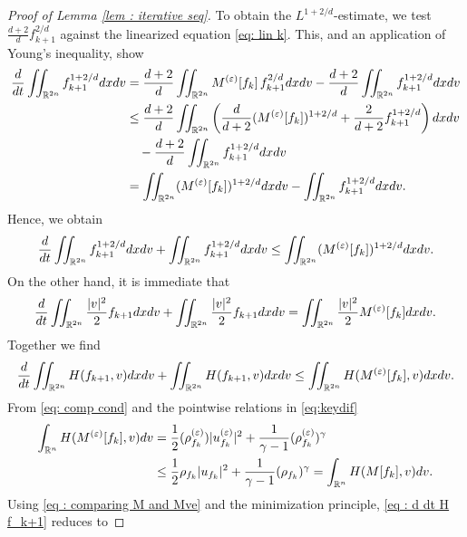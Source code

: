 \documentclass{amsart}
\theoremstyle{plain}
\theoremstyle{remark}
\numberwithin{equation}{section}
\newcommand{\R}{\mathbb{R}}
\newcommand{\ve}{\varepsilon}
\newcommand{\dx}{\textnormal{d}x}
\newcommand{\dv}{\textnormal{d}v}
\begin{document}
\begin{proof}[Proof of Lemma \ref{lem : iterative seq}]
To obtain the $L^{1+2/d}$-estimate, we test $\frac{d+2}{d}f_{k+1}^{2/d}$ against the linearized equation \eqref{eq: lin k}. This, and an application of Young's inequality, show
\begin{align*}
    \frac{\textnormal{d}}{\textnormal{d}t} \iint_{\R^{2n}} f_{k+1}^{1+2/d} \dx\dv
    &= \frac{d+2}{d}\iint_{\R^{2n}} M^{(\ve)}[f_k] \, f_{k+1}^{2/d} \dx\dv - \frac{d+2}{d}\iint_{\R^{2n}} f_{k+1}^{1+2/d}\dx\dv \\
    &\le \frac{d+2}{d}\iint_{\R^{2n}} \left(\frac{d}{d+2}(M^{(\ve)}[f_k])^{1+2/d} + \frac{2}{d+2} f_{k+1}^{1+2/d} \right)\dx\dv\\
    &\quad - \frac{d+2}{d}\iint_{\R^{2n}} f_{k+1}^{1+2/d}\dx\dv\\
    &= \iint_{\R^{2n}} (M^{(\ve)}[f_k])^{1+2/d} \dx\dv - \iint_{\R^{2n}} f_{k+1}^{1+2/d}\dx\dv.
\end{align*}
Hence, we obtain
\begin{align*}
    \frac{\textnormal{d}}{\textnormal{d}t}\iint_{\R^{2n}} f_{k+1}^{1+2/d} \dx \dv + \iint_{\R^{2n}} f_{k+1}^{1+2/d} \dx \dv \le \iint_{\R^{2n}} (M^{(\ve)}[f_k])^{1+2/d} \dx \dv.
\end{align*}
On the other hand, it is immediate that
\begin{align*}
    \frac{\textnormal{d}}{\textnormal{d}t}\iint_{\R^{2n}} \frac{|v|^2}{2} f_{k+1} \dx \dv + \iint_{\R^{2n}} \frac{|v|^2}{2} f_{k+1} \dx \dv = \iint_{\R^{2n}} \frac{|v|^2}{2} M^{(\ve)}[f_k] \dx \dv.
\end{align*}
Together we find
\begin{align}
\label{eq : d dt H f_k+1}
    \frac{\textnormal{d}}{\textnormal{d}t}\iint_{\R^{2n}} H(f_{k+1},v) \dx \dv + \iint_{\R^{2n}} H(f_{k+1},v) \dx \dv \le \iint_{\R^{2n}} H(M^{(\ve)}[f_k],v) \dx \dv.
\end{align}
From \eqref{eq: comp cond} and the pointwise relations in \eqref{eq:keydif}
\begin{equation}
\label{eq : comparing M and Mve}
\begin{split}
    \int_{\R^n} H(M^{(\ve)}[f_k],v) \dv &= \frac{1}{2}(\rho_{f_k}^{(\ve)})|u_{f_k}^{(\ve)}|^2 + \frac{1}{\gamma-1}(\rho_{f_k}^{(\ve)})^\gamma  \\
    &\le \frac{1}{2}\rho_{f_k}|u_{f_k}|^2 + \frac{1}{\gamma-1}(\rho_{f_k})^\gamma = \int_{\R^n} H(M[f_k],v)\dv.
    \end{split}
\end{equation}
Using \eqref{eq : comparing M and Mve} and the minimization principle, \eqref{eq : d dt H f_k+1} reduces to

\end{proof}
\end{document}
